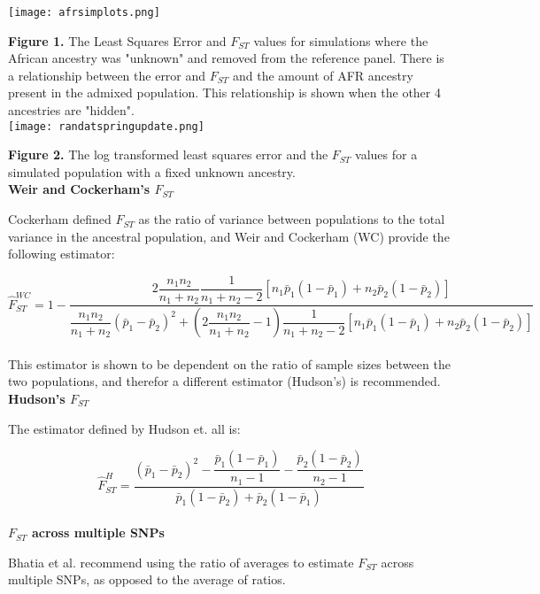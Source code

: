 \documentclass[11pt,a4paper]{article}
\begin{document}
\texttt{[image: afrsimplots.png]} 

\textbf{Figure 1.} The Least Squares Error and $F_{ST}$ values for simulations where the African ancestry was "unknown" and removed from the reference panel. There is a relationship between the error and $F_{ST}$ and the amount of AFR ancestry present in the admixed population. This relationship is shown when the other 4 ancestries are "hidden".\\

\texttt{[image: randatspringupdate.png]} 

\textbf{Figure 2.} The log transformed least squares error and the $F_{ST}$ values for a simulated population with a fixed unknown ancestry.\\


\textbf{Weir and Cockerham's $ F_{ST} $}

Cockerham defined $F_{ST}$ as the ratio of variance between populations to the total variance in the ancestral population, and Weir and Cockerham (WC) provide the following estimator:

$$ \hat{F}_{ST}^{WC} = 1 - \dfrac{2 \dfrac{n_1 n_2}{n_1 + n_2} \dfrac{1}{n_1 + n_2 - 2} \left[ n_1 \bar{p}_1 \left( 1 - \bar{p}_1 \right) + n_2 \bar{p}_2 \left( 1 - \bar{p}_2 \right) \right] }{\dfrac{n_1 n_2}{n_1 + n_2} \left( \bar{p}_1 - \bar{p}_2 \right)^{2} + \left( 2 \dfrac{n_1 n_2}{n_1 + n_2} - 1 \right) \dfrac{1}{n_1 + n_2 - 2} \left[ n_1 \bar{p}_1 \left( 1 - \bar{p}_1 \right) + n_2 \bar{p}_2 \left( 1 - \bar{p}_2 \right) \right] } $$\\

This estimator is shown to be dependent on the ratio of sample sizes between the two populations, and therefor a different estimator (Hudson's) is recommended.\\

\textbf{Hudson's $F_{ST}$}

The estimator defined by Hudson et. all is:

$$ \hat{F}_{ST}^{H} = \dfrac{ \left( \bar{p}_1 - \bar{p}_2 \right)^2 - \dfrac{\bar{p}_1 \left( 1 - \bar{p}_1 \right)}{n_1 - 1} - \dfrac{\bar{p}_2 \left( 1 - \bar{p}_2 \right)}{n_2 - 1} }{\bar{p}_1 \left( 1 - \bar{p}_2 \right) + \bar{p}_2 \left( 1 - \bar{p}_1 \right)} $$\\

\textbf{$F_{ST}$ across multiple SNPs}

Bhatia et al. recommend using the ratio of averages to estimate $F_{ST}$ across multiple SNPs, as opposed to the average of ratios.
\end{document}
